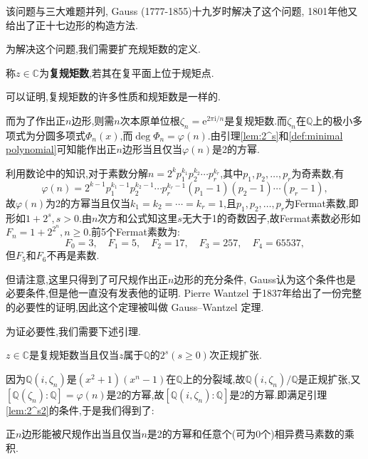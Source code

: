 该问题与三大难题并列, Gauss (1777-1855)十九岁时解决了这个问题, 1801年他又给出了正十七边形的构造方法.

为解决这个问题,我们需要扩充规矩数的定义.
\begin{definition}
	称$z\in\mathbb{C}$为\textbf{复规矩数},若其在复平面上位于规矩点.
\end{definition}

可以证明,复规矩数的许多性质和规矩数是一样的.

而为了作出正$n$边形,则需$n$次本原单位根$\zeta_n=\mathrm{e}^{2\pi\mathrm{i}/n}$是复规矩数.而$\zeta_n$在$\mathbb{Q}$上的极小多项式为分圆多项式$\Phi_n(x)$,而$\deg\Phi_n=\varphi(n)$.由引理\ref{lem:2^s}和\ref{def:minimal polynomial}可知能作出正$n$边形当且仅当$\varphi(n)$是2的方幂.

利用数论中的知识,对于素数分解$n=2^kp_1^{k_1} p_2^{k_2} \cdots p_r^{k_r}$,其中$p_1,p_2,\dots,p_r$为奇素数,有
\[
\varphi(n)=2^{k-1}p_1^{k_1-1} p_2^{k_2 - 1} \cdots p_r^{k_r - 1} (p_1 - 1) (p_2 - 1) \cdots (p_r - 1),
\]
故$\varphi(n)$为2的方幂当且仅当$k_1=k_2=\cdots=k_r=1$,且$p_1,p_2,\dots,p_r$为Fermat素数,即形如$1+2^s,s>0$.由$n$次方和公式知这里$s$无大于1的奇数因子,故Fermat素数必形如$F_n=1+2^{2^n},n\geqslant0$.前5个Fermat素数为:
\[
F_0=3,\quad F_1=5,\quad F_2=17,\quad F_3=257,\quad F_4=65537,
\]
但$F_5$和$F_6$不再是素数.

但请注意,这里只得到了可尺规作出正$n$边形的充分条件, Gauss认为这个条件也是必要条件,但是他一直没有发表他的证明. Pierre Wantzel 于1837年给出了一份完整的必要性的证明,因此这个定理被叫做 Gauss–Wantzel 定理.

为证必要性,我们需要下述引理.
\begin{lemma}\label{lem:2^s2}
	$z\in\mathbb{C}$是复规矩数当且仅当$z$属于$\mathbb{Q}$的$2^s(s\geqslant 0)$次正规扩张.
\end{lemma}

因为$\mathbb{Q}(i,\zeta_n)$是$(x^2+1)(x^n-1)$在$\mathbb{Q}$上的分裂域,故$\mathbb{Q}(i,\zeta_n)/\mathbb{Q}$是正规扩张,又$[\mathbb{Q}(\zeta_n):\mathbb{Q}]=\varphi(n)$是2的方幂,故$[\mathbb{Q}(i,\zeta_n):\mathbb{Q}]$是2的方幂.即满足引理\ref{lem:2^s2}的条件,于是我们得到了:
\begin{theorem}
	正$n$边形能被尺规作出当且仅当$n$是2的方幂和任意个(可为0个)相异费马素数的乘积.
\end{theorem}